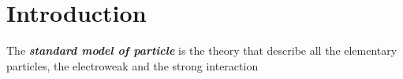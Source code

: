 
%

\chapter{Introduction}

	The \textbf{\emph{standard model of particle}} is the theory that describe all the elementary particles, the electroweak \cite{PhysRevLett.19.1264} and the strong interaction 
	
	
%